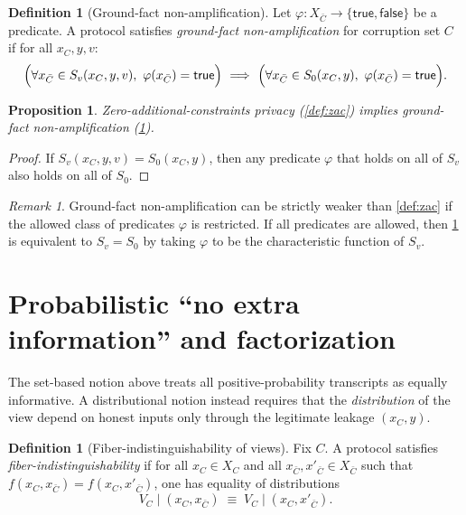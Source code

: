 \documentclass[11pt,a4paper]{article}
\newtheorem{proposition}[theorem]{Proposition}
\theoremstyle{definition}
\newtheorem{definition}[theorem]{Definition}
\theoremstyle{remark}
\newtheorem{remark}[theorem]{Remark}
\begin{document}
\begin{definition}[Ground-fact non-amplification]
\label{def:ground-facts}
Let $\varphi : X_{\bar C}\to\{\mathsf{true},\mathsf{false}\}$ be a predicate.
A protocol satisfies \emph{ground-fact non-amplification} for corruption set $C$ if for all $x_C,y,v$:
\[
\Bigl(\forall x_{\bar C}\in S_v(x_C,y,v),\ \varphi(x_{\bar C})=\mathsf{true}\Bigr)\ \Longrightarrow\
\Bigl(\forall x_{\bar C}\in S_0(x_C,y),\ \varphi(x_{\bar C})=\mathsf{true}\Bigr).
\]
\end{definition}

\begin{proposition}
\label{prop:zac-implies-ground}
Zero-additional-constraints privacy (\cref{def:zac}) implies ground-fact non-amplification (\cref{def:ground-facts}).
\end{proposition}

\begin{proof}
If $S_v(x_C,y,v)=S_0(x_C,y)$, then any predicate $\varphi$ that holds on all of $S_v$ also holds on all of $S_0$.
\end{proof}

\begin{remark}
\label{rem:ground-does-not-imply-zac}
Ground-fact non-amplification can be strictly weaker than \cref{def:zac} if the allowed class of predicates $\varphi$ is restricted. If all predicates are allowed, then \cref{def:ground-facts} is equivalent to $S_v=S_0$ by taking $\varphi$ to be the characteristic function of $S_v$.
\end{remark}

\section{Probabilistic ``no extra information'' and factorization}
\label{sec:probabilistic}

The set-based notion above treats all positive-probability transcripts as equally informative. A distributional notion instead requires that the \emph{distribution} of the view depend on honest inputs only through the legitimate leakage $(x_C,y)$.

\begin{definition}[Fiber-indistinguishability of views]
\label{def:fiber-ind}
Fix $C$. A protocol satisfies \emph{fiber-indistinguishability} if for all $x_C\in X_C$ and all $x_{\bar C},x'_{\bar C}\in X_{\bar C}$ such that
$f(x_C,x_{\bar C})=f(x_C,x'_{\bar C})$, one has equality of distributions
\[
V_C\mid (x_C,x_{\bar C}) \;\equiv\; V_C\mid (x_C,x'_{\bar C}).
\]
\end{definition}
\end{document}
